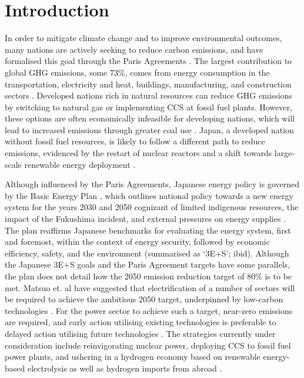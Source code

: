 \section{Introduction} \label{Introduction}
In order to mitigate climate change and to improve environmental outcomes, many nations are actively seeking to reduce carbon emissions, and have formalised this goal through the Paris Agreements \cite{united_nations_framework_convention_on_climate_change_unfccc_submission_2015}. The largest contribution to global \gls{GHG} emissions, some 73\%, comes from energy consumption in the transportation, electricity and heat, buildings, manufacturing, and construction sectors \cite{ge_4_2020}. Developed nations rich in natural resources can reduce \gls{GHG} emissions by switching to natural gas or implementing \gls{CCS} at fossil fuel plants. However, these options are often economically infeasible for developing nations, which will lead to increased emissions through greater coal use \cite{international_energy_agency_latest_2019}. Japan, a developed nation without fossil fuel resources, is likely to follow a different path to reduce emissions, evidenced by the restart of nuclear reactors and a shift towards large-scale renewable energy deployment \cite{international_energy_agency_latest_2019}.

Although influenced by the Paris Agreements, Japanese energy policy is governed by the Basic Energy Plan \cite{meti_japans_2018}, which outlines national policy towards a new energy system for the years 2030 and 2050 cognizant of limited indigenous resources, the impact of the Fukushima incident, and external pressures on energy supplies \cite{meti_annual_2018}. The plan reaffirms Japanese benchmarks for evaluating the energy system, first and foremost, within the context of energy security, followed by economic efficiency, safety, and the environment (summarised as `3E+S'; ibid). Although the Japanese 3E+S goals and the Paris Agreement targets have some parallels, the plan does not detail how the 2050 emission reduction target of 80\% is to be met. Matsuo et. al have suggested that electrification of a number of sectors will be required to achieve the ambitious 2050 target, underpinned by low-carbon technologies \cite{matsuo_quantitative_2018}. For the power sector to achieve such a target, near-zero emissions are required, and early action utilising existing technologies is preferable to delayed action utilising future technologies \cite{ashina_roadmap_2012}. The strategies currently under consideration include reinvigorating nuclear power, deploying \gls{CCS} to fossil fuel power plants, and ushering in a hydrogen economy based on renewable energy-based electrolysis as well as hydrogen imports from abroad \cite{ashina_roadmap_2012, matsuo_quantitative_2018, meti_basic_2017}. 

